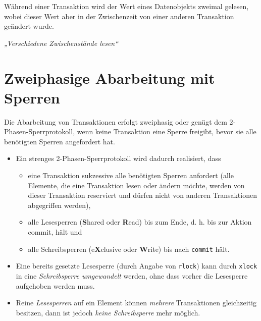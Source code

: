 \documentclass{lehramt-informatik-haupt}
\begin{document}
Während einer Transaktion wird der Wert eines Datenobjekts zweimal
gelesen, wobei dieser Wert aber in der Zwischenzeit von einer anderen
Transaktion geändert wurde.

\emph{„Verschiedene Zwischenstände lesen“}

%

\section{Zweiphasige Abarbeitung mit Sperren}

\cite[Seite 15]{db:fs:5}

Die Abarbeitung von Transaktionen erfolgt zweiphasig oder genügt dem
2-Phasen-Sperrprotokoll, wenn keine Transaktion eine Sperre freigibt,
bevor sie alle benötigten Sperren angefordert hat.

\begin{itemize}
\item Ein strenges 2-Phasen-Sperrprotokoll wird dadurch realisiert, dass

\begin{itemize}
\item eine Transaktion sukzessive alle benötigten Sperren anfordert
(alle Elemente, die eine Transaktion lesen oder ändern möchte, werden
von dieser Transaktion reserviert und dürfen nicht von anderen
Transaktionen abgegriffen werden),

\item alle Lesesperren (\textbf{S}hared oder \textbf{R}ead) bis zum
Ende, d. h. bis zur Aktion commit, hält und

\item alle Schreibsperren (e\textbf{X}clusive oder \textbf{W}rite) bis
nach \texttt{commit} hält.
\end{itemize}

\item Eine bereits gesetzte Lesesperre (durch Angabe von \texttt{rlock})
kann durch \texttt{xlock} in eine \emph{Schreibsperre umgewandelt}
werden, ohne dass vorher die Lesesperre aufgehoben werden muss.

\item Reine \emph{Lesesperren} auf ein Element können \emph{mehrere}
Transaktionen gleichzeitig besitzen, dann ist jedoch \emph{keine
Schreibsperre} mehr möglich.
\end{itemize}
\end{document}
